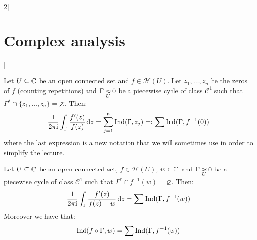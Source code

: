 \documentclass[../../../main.tex]{subfiles}
\begin{document}
\begin{multicols}{2}[\section{Complex analysis}]
  \begin{theorem}
    Let $U\subseteq\mathbb{C}$ be an open connected set and $f\in\mathcal{H}(U)$. Let $z_1,\ldots,z_n$ be the zeros of $f$ (counting repetitions) and $\Gamma\mathbin{\underset{U}{\approx}} 0$ be a piecewise cycle of class $\mathcal{C}^1$ such that $\Gamma^*\cap\{z_1,\ldots,z_n\}=\varnothing$. Then:
    $$\frac{1}{2\pi\mathrm{i}}\int_{\Gamma}\frac{f'(z)}{f(z)}\dd{z}=\sum_{j=1}^n\operatorname{Ind}(\Gamma,z_j)=:\sum\operatorname{Ind}(\Gamma,f^{-1}(0))$$
    where the last expression is a new notation that we will sometimes use in order to simplify the lecture.
  \end{theorem}
  \begin{corollary}
    Let $U\subseteq\mathbb{C}$ be an open connected set, $f\in\mathcal{H}(U)$, $w\in \mathbb{C}$ and $\Gamma\mathbin{\underset{U}{\approx}} 0$ be a piecewise cycle of class $\mathcal{C}^1$ such that $\Gamma^*\cap f^{-1}(w)=\varnothing$. Then:
    $$\frac{1}{2\pi\mathrm{i}}\int_{\Gamma}\frac{f'(z)}{f(z)-w}\dd{z}=\sum\operatorname{Ind}(\Gamma,f^{-1}(w))$$
    Moreover we have that:
    $$\operatorname{Ind}(f\circ\Gamma,w)=\sum\operatorname{Ind}(\Gamma,f^{-1}(w))$$
  \end{corollary}

\end{multicols}
\end{document}
